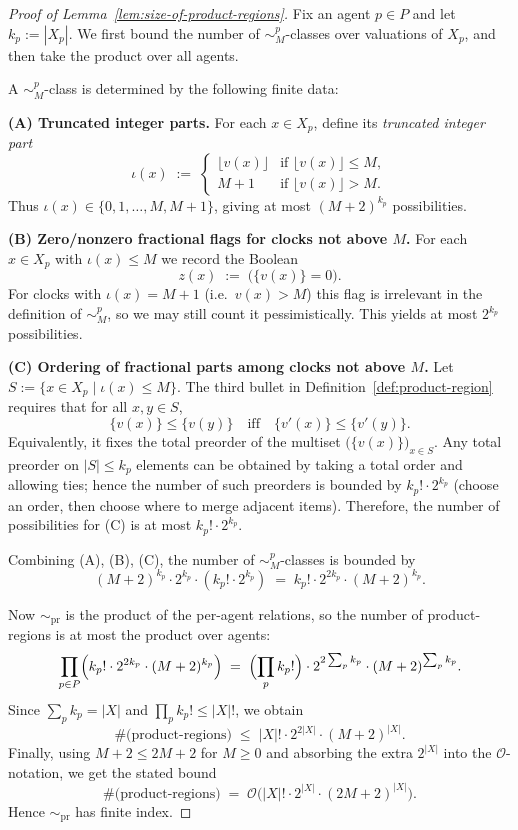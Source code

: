 \begin{proof}[Proof of Lemma~\ref{lem:size-of-product-regions}]
Fix an agent $p\in P$ and let $k_p := |X_p|$.  We first bound the number of
$\sim^p_M$-classes over valuations of $X_p$, and then take the product over all
agents.

A $\sim^p_M$-class is determined by the following finite data:

\medskip\noindent
\textbf{(A) Truncated integer parts.}
For each $x\in X_p$, define its \emph{truncated integer part}
\[
  \iota(x) \;:=\;
  \begin{cases}
    \lfloor v(x)\rfloor & \text{if } \lfloor v(x)\rfloor \le M,\\
    M+1 & \text{if } \lfloor v(x)\rfloor > M.
  \end{cases}
\]
Thus $\iota(x)\in\{0,1,\dots,M,M+1\}$, giving at most $(M+2)^{k_p}$ possibilities.

\medskip\noindent
\textbf{(B) Zero/nonzero fractional flags for clocks not above $M$.}
For each $x\in X_p$ with $\iota(x)\le M$ we record the Boolean
\[
  z(x) \;:=\; \bigl( \{v(x)\}=0 \bigr).
\]
For clocks with $\iota(x)=M+1$ (i.e.\ $v(x)>M$) this flag is irrelevant in the
definition of $\sim^p_M$, so we may still count it pessimistically. This yields
at most $2^{k_p}$ possibilities.

\medskip\noindent
\textbf{(C) Ordering of fractional parts among clocks not above $M$.}
Let $S := \{x\in X_p \mid \iota(x)\le M\}$.
The third bullet in Definition~\ref{def:product-region} requires that for all
$x,y\in S$,
\[
  \{v(x)\}\le \{v(y)\} \quad\text{iff}\quad \{v'(x)\}\le \{v'(y)\}.
\]
Equivalently, it fixes the total preorder of the multiset
$\bigl(\{v(x)\}\bigr)_{x\in S}$.
Any total preorder on $|S|\le k_p$ elements can be obtained by taking a total
order and allowing ties; hence the number of such preorders is bounded by
$k_p!\cdot 2^{k_p}$ (choose an order, then choose where to merge adjacent items).
Therefore, the number of possibilities for (C) is at most $k_p!\cdot 2^{k_p}$.

\medskip
Combining (A), (B), (C), the number of $\sim^p_M$-classes is bounded by
\[
  (M+2)^{k_p}\cdot 2^{k_p}\cdot (k_p!\cdot 2^{k_p})
  \;=\; k_p!\cdot 2^{2k_p}\cdot (M+2)^{k_p}.
\]

Now $\sim_{\mathrm{pr}}$ is the product of the per-agent relations, so the number
of product-regions is at most the product over agents:
\[
  \prod_{p\in P} \Bigl(k_p!\cdot 2^{2k_p}\cdot (M+2)^{k_p}\Bigr)
  \;=\;
  \Bigl(\prod_{p} k_p!\Bigr)\cdot 2^{2\sum_p k_p}\cdot (M+2)^{\sum_p k_p}.
\]
Since $\sum_p k_p = |X|$ and $\prod_p k_p! \le |X|!$, we obtain
\[
  \#\text{(product-regions)} \;\le\; |X|!\cdot 2^{2|X|}\cdot (M+2)^{|X|}.
\]
Finally, using $M+2 \le 2M+2$ for $M\ge 0$ and absorbing the extra $2^{|X|}$ into
the $\mathcal{O}$-notation, we get the stated bound
\[
  \#\text{(product-regions)} \;=\; \mathcal{O}\bigl(|X|!\cdot 2^{|X|}\cdot (2M+2)^{|X|}\bigr).
\]
Hence $\sim_{\mathrm{pr}}$ has finite index.
\end{proof}

